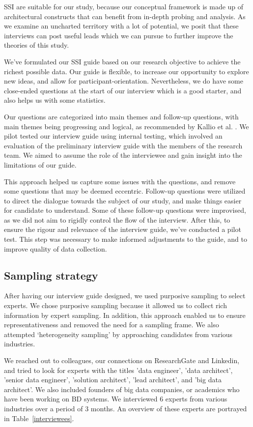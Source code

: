 \documentclass{bmcart}
\begin{document}
SSI are suitable for our study, because our conceptual framework is made up of architectural constructs that can benefit from in-depth probing and analysis. As we examine an uncharted territory with a lot of potential, we posit that these interviews can post useful leads which we can pursue to further improve the theories of this study.

 We've formulated our SSI guide based on our research objective to achieve the richest possible data. Our guide is flexible, to increase our opportunity to explore new ideas, and allow for participant-orientation. Nevertheless, we do have some close-ended questions at the start of our interview which is a good starter, and also helps us with some statistics. 

Our questions are categorized into main themes and follow-up questions, with main themes being progressing and logical, as recommended by Kallio et al. \cite{kallio2016systematic}. We pilot tested our interview guide using internal testing, which involved an evaluation of the preliminary interview guide with the members of the research team. We aimed to assume the role of the interviewee and gain insight into the limitations of our guide.

This approach helped us capture some issues with the questions, and remove some questions that may be deemed eccentric. Follow-up questions were utilized to direct the dialogue towards the subject of our study, and make things easier for candidate to understand. Some of these follow-up questions were improvised, as we did not aim to rigidly control the flow of the interview. After this, to ensure the rigour and relevance of the interview guide, we've conducted a pilot test. This step was necessary to make informed adjustments to the guide, and to improve quality of data collection. 


\subsection{Sampling strategy}

After having our interview guide designed, we used purposive sampling \cite{baltes2022sampling} to select experts. We chose purposive sampling because it allowed us to collect rich information by expert sampling. In addition, this approach enabled us to ensure representativeness and removed the need for a sampling frame. We also attempted `heterogeneity sampling' by approaching candidates from various industries. 

We reached out to colleagues, our connections on ResearchGate and Linkedin, and tried to look for experts with the titles 'data engineer', 'data architect', 'senior data engineer', 'solution architect', 'lead architect', and 'big data architect'. We also included founders of big data companies, or academics who have been working on BD systems. We interviewed 6 experts from various industries over a period of 3 months. An overview of these experts are portrayed in Table~\ref{interviewees}. 
\end{document}
